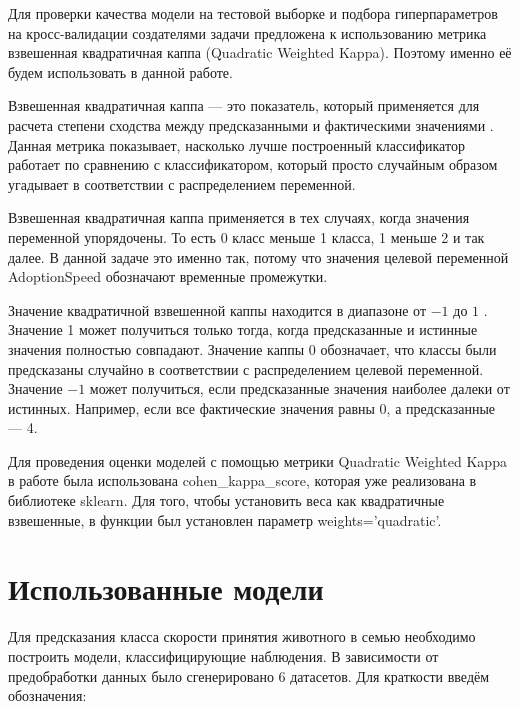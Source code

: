 \documentclass[14pt]{mmcs_article}
\begin{document}
Для проверки качества модели на тестовой выборке и подбора гиперпараметров на кросс-валидации создателями задачи предложена к использованию метрика взвешенная квадратичная каппа (Quadratic Weighted Kappa). Поэтому именно её будем использовать в данной работе. 

Взвешенная квадратичная каппа --- это показатель, который применяется для расчета степени сходства между предсказанными и фактическими значениями \cite{lib:kappa1}. Данная метрика показывает, насколько лучше построенный классификатор работает по сравнению с классификатором, который просто случайным образом угадывает в соответствии с распределением переменной.

Взвешенная квадратичная каппа применяется в тех случаях, когда значения переменной упорядочены. То есть 0 класс меньше 1 класса, 1 меньше 2 и так далее. В данной задаче это именно так, потому что значения целевой переменной AdoptionSpeed обозначают временные промежутки. 

Значение квадратичной взвешенной каппы находится в диапазоне от $-1$ до $1$ \cite{lib:kappa2}. Значение 1 может получиться только тогда, когда предсказанные и истинные значения полностью совпадают. Значение каппы 0 обозначает, что классы были предсказаны случайно в соответствии с распределением целевой переменной. Значение $-1$ может получиться, если предсказанные значения наиболее далеки от истинных. Например, если все фактические значения равны 0, а предсказанные --- 4.

Для проведения оценки моделей с помощью метрики Quadratic Weighted Kappa в работе была использована cohen\_kappa\_score, которая уже реализована в библиотеке sklearn. Для того, чтобы установить веса как квадратичные взвешенные, в функции был установлен параметр weights='quadratic'.


\newpage
\section{Использованные модели}

Для предсказания класса скорости принятия животного в семью необходимо построить модели, классифицирующие наблюдения. В зависимости от предобработки данных было сгенерировано 6 датасетов. Для краткости введём обозначения: 
\end{document}
